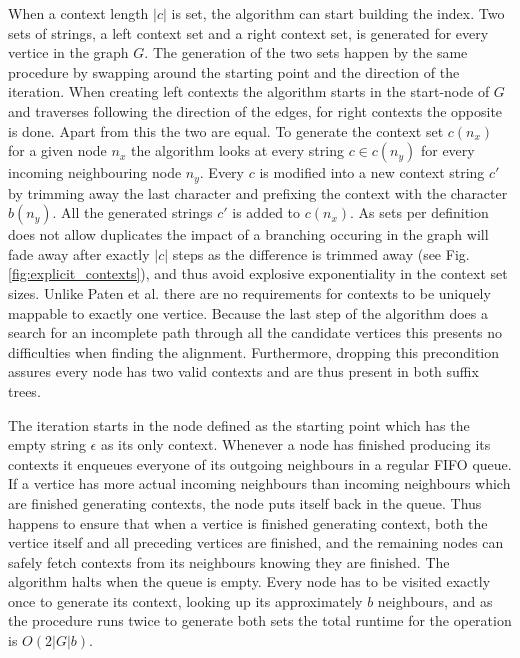 \documentclass[thesis.tex]{subfiles}
\begin{document}
When a context length $|c|$ is set, the algorithm can start building the index. Two sets of strings, a left context set and a right context set, is generated for every vertice in the graph $G$. The generation of the two sets happen by the same procedure by swapping around the starting point and the direction of the iteration. When creating left contexts the algorithm starts in the start-node of $G$ and traverses following the direction of the edges, for right contexts the opposite is done. Apart from this the two are equal. To generate the context set $c(n_x)$ for a given node $n_x$ the algorithm looks at every string $c \in c(n_y)$ for every incoming neighbouring node $n_y$. Every $c$ is modified into a new context string $c'$ by trimming away the last character and prefixing the context with the character $b(n_y)$. All the generated strings $c'$ is added to $c(n_x)$. As sets per definition does not allow duplicates the impact of a branching occuring in the graph will fade away after exactly $|c|$ steps as the difference is trimmed away (see Fig. \ref{fig:explicit_contexts}), and thus avoid explosive exponentiality in the context set sizes. Unlike Paten et al. \cite{mapping_to_a_reference_genome_structure} there are no requirements for contexts to be uniquely mappable to exactly one vertice. Because the last step of the algorithm does a search for an incomplete path through all the candidate vertices this presents no difficulties when finding the alignment. Furthermore, dropping this precondition assures every node has two valid contexts and are thus present in both suffix trees.\\
\par\noindent
The iteration starts in the node defined as the starting point which has the empty string $\epsilon$ as its only context. Whenever a node has finished producing its contexts it enqueues everyone of its outgoing neighbours in a regular FIFO queue. If a vertice has more actual incoming neighbours than incoming neighbours which are finished generating contexts, the node puts itself back in the queue. Thus happens to ensure that when a vertice is finished generating context, both the vertice itself and all preceding vertices are finished, and the remaining nodes can safely fetch contexts from its neighbours knowing they are finished. The algorithm halts when the queue is empty. Every node has to be visited exactly once to generate its context, looking up its approximately $b$ neighbours, and as the procedure runs twice to generate both sets the total runtime for the operation is $O(2|G|b)$.\\
\end{document}
